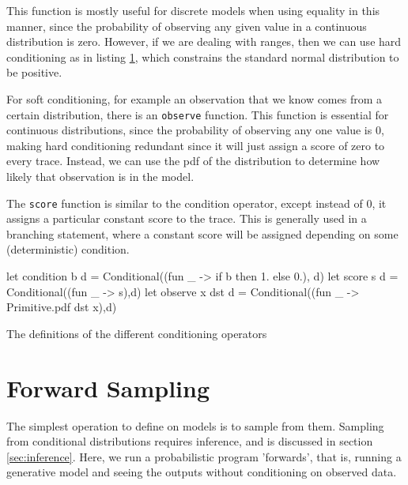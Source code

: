 This function is mostly useful for discrete models when using equality in this manner, since the probability of observing any given value in a continuous distribution is zero. However, if we are dealing with ranges, then we can use hard conditioning as in listing \ref{lst:half_normal}, which constrains the standard normal distribution to be positive.

\begin{figure}[!htb]
	\begin{minipage}{0.5\textwidth}
		\label{lst:dice}
	\end{minipage}
	\begin{minipage}{0.5\textwidth}
		\label{lst:half_normal}
	\end{minipage}
\end{figure}
			
For soft conditioning, for example an observation that we know comes from a certain distribution, there is an \texttt{observe} function. This function is essential for continuous distributions, since the probability of observing any one value is 0, making hard conditioning redundant since it will just assign a score of zero to every trace. Instead, we can use the pdf of the distribution to determine how likely that observation is in the model.
			
The \texttt{score} function is similar to the condition operator, except instead of 0, it assigns a particular constant score to the trace. This is generally used in a branching statement, where a constant score will be assigned depending on some (deterministic) condition.
				
\begin{listing}[!htb]
	\centering
	\begin{ocamlcode-in}
		let condition b d = Conditional((fun _ -> if b then 1. else 0.), d)
		let score s d = Conditional((fun _ -> s),d)
		let observe x dst d = Conditional((fun _ -> Primitive.pdf dst x),d) 
	\end{ocamlcode-in}	
	\caption{The definitions of the different conditioning operators}
	\label{lst:cond}
\end{listing}
				
\section{Forward Sampling}
The simplest operation to define on models is to sample from them. Sampling from conditional distributions requires inference, and is discussed in section \ref{sec:inference}. Here, we run a probabilistic program 'forwards', that is, running a generative model and seeing the outputs without conditioning on observed data.
					
